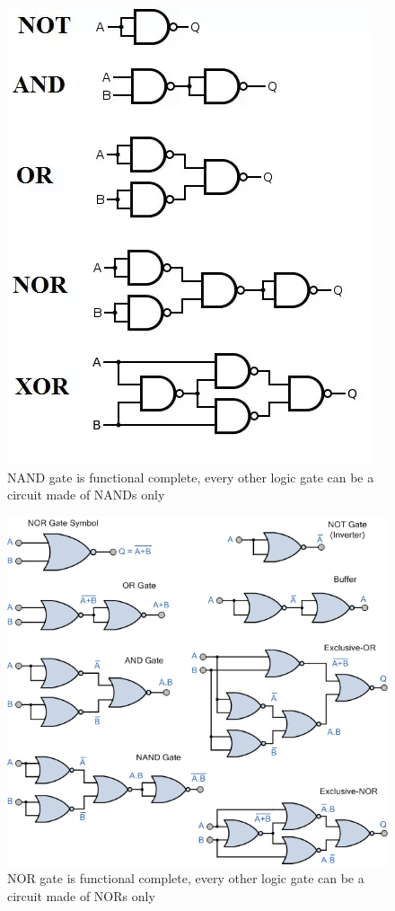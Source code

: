 \documentclass{article}
\begin{document}
\begin{figure}[h]
    \centering
    \includegraphics[scale=.42]{IM_NAND_allpowerful.png}
    \caption{NAND gate is functional complete, every other logic gate can be a circuit made of NANDs only}
    \label{NAND_allpowerful}
\end{figure}

\begin{figure}[h]
    \centering
    \includegraphics[scale=.5]{IM_NOR_allpowerful.png}
    \caption{NOR gate is functional complete, every other logic gate can be a circuit made of NORs only}
    \label{NOR_allpowerful}
\end{figure}
\end{document}
